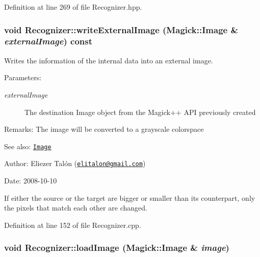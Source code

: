 Definition at line 269 of file Recognizer.hpp.\hypertarget{class_recognizer_559f62a3e3e2d0b799bab38e975b4b67}{
\subsubsection[writeExternalImage]{\setlength{\rightskip}{0pt plus 5cm}void Recognizer::writeExternalImage (Magick::Image \& {\em externalImage}) const}}
\label{class_recognizer_559f62a3e3e2d0b799bab38e975b4b67}


Writes the information of the internal data into an external image. 

\begin{Desc}
\item[Parameters:]
\begin{description}
\item[{\em externalImage}]The destination Image object from the Magick++ API previously created\end{description}
\end{Desc}
\begin{Desc}
\item[Remarks:]The image will be converted to a grayscale colorspace\end{Desc}
\begin{Desc}
\item[See also:]\href{http://www.imagemagick.org/Magick++/Image.html}{\tt Image}\end{Desc}
\begin{Desc}
\item[Author:]Eliezer Talón (\href{mailto:elitalon@gmail.com}{\tt elitalon@gmail.com}) \end{Desc}
\begin{Desc}
\item[Date:]2008-10-10\end{Desc}
If either the source or the target are bigger or smaller than its counterpart, only the pixels that match each other are changed. 

Definition at line 152 of file Recognizer.cpp.\hypertarget{class_recognizer_acc4244738f2577a0c344c3b3af22eb0}{
\subsubsection[loadImage]{\setlength{\rightskip}{0pt plus 5cm}void Recognizer::loadImage (Magick::Image \& {\em image})}}
\label{class_recognizer_acc4244738f2577a0c344c3b3af22eb0}



